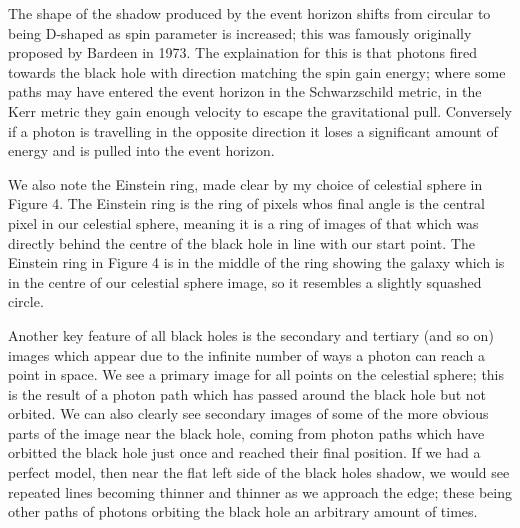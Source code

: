 \documentclass[landscape,a2paper,fontscale=1]{baposter} %
\begin{document}
\begin{poster}
{\vspace{1em}
The shape of the shadow produced by the event horizon shifts from circular to being D-shaped as spin parameter is increased; this was famously originally proposed by Bardeen \cite{bardeen1973timelike} in 1973. The explaination for this is that photons fired towards the black hole with direction matching the spin gain energy; where some paths may have entered the event horizon in the Schwarzschild metric, in the Kerr metric they gain enough velocity to escape the gravitational pull. Conversely if a photon is travelling in the opposite direction it loses a significant amount of energy and is pulled into the event horizon.

\vspace{1em}
We also note the Einstein ring, made clear by my choice of celestial sphere in Figure 4. The Einstein ring is the ring of pixels whos final angle is the central pixel in our celestial sphere, meaning it is a ring of images of that which was directly behind the centre of the black hole in line with our start point. The Einstein ring in Figure 4 is in the middle of the ring showing the galaxy which is in the centre of our celestial sphere image, so it resembles a slightly squashed circle.

\vspace{1em}
Another key feature of all black holes is the secondary and tertiary (and so on) images which appear due to the infinite number of ways a photon can reach a point in space. We see a primary image for all points on the celestial sphere; this is the result of a photon path which has passed around the black hole but not orbited. We can also clearly see secondary images of some of the more obvious parts of the image near the black hole, coming from photon paths which have orbitted the black hole just once and reached their final position. If we had a perfect model, then near the flat left side of the black holes shadow, we would see repeated lines becoming thinner and thinner as we approach the edge; these being other paths of photons orbiting the black hole an arbitrary amount of times.
}





\end{poster}
\end{document}
